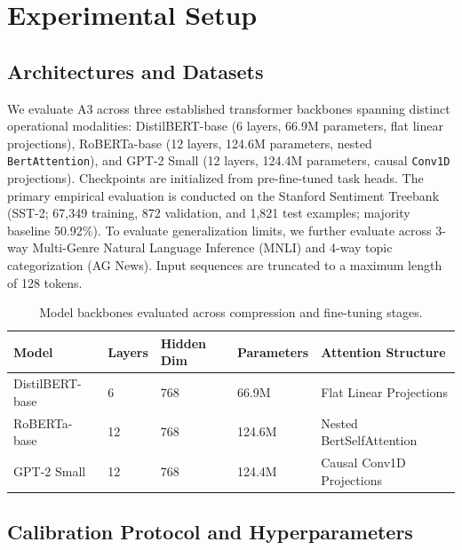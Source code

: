 
\section{Experimental Setup}
\label{sec:setup}

\subsection{Architectures and Datasets}

We evaluate A3 across three established transformer backbones spanning distinct operational modalities: DistilBERT-base (6 layers, 66.9M parameters, flat linear projections), RoBERTa-base (12 layers, 124.6M parameters, nested \texttt{BertAttention}), and GPT-2 Small (12 layers, 124.4M parameters, causal \texttt{Conv1D} projections). Checkpoints are initialized from pre-fine-tuned task heads. The primary empirical evaluation is conducted on the Stanford Sentiment Treebank (SST-2; 67,349 training, 872 validation, and 1,821 test examples; majority baseline 50.92\%). To evaluate generalization limits, we further evaluate across 3-way Multi-Genre Natural Language Inference (MNLI) and 4-way topic categorization (AG News). Input sequences are truncated to a maximum length of 128 tokens.

\begin{table}[H]
\centering
\small
\begin{tabular}{lllll}
\toprule
\textbf{Model} & \textbf{Layers} & \textbf{Hidden Dim} & \textbf{Parameters} & \textbf{Attention Structure} \\
\midrule
DistilBERT-base & 6  & 768 & 66.9M  & Flat Linear Projections \\
RoBERTa-base    & 12 & 768 & 124.6M & Nested BertSelfAttention \\
GPT-2 Small     & 12 & 768 & 124.4M & Causal Conv1D Projections \\
\bottomrule
\end{tabular}
\caption{Model backbones evaluated across compression and fine-tuning stages.}
\label{tab:setup_models}
\end{table}

\subsection{Calibration Protocol and Hyperparameters}
\label{sec:setup_calibration}


